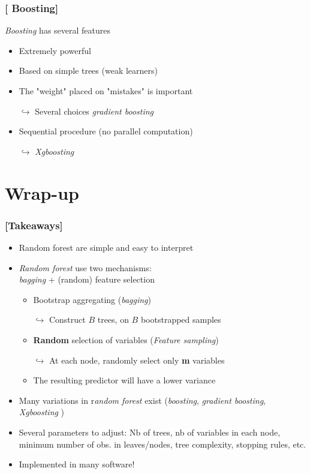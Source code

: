 \documentclass[xcolor=x11names,compress]{beamer}
\renewcommand{\(}{\begin{columns}}
\renewcommand{\)}{\end{columns}}
\newcommand{\<}[1]{\begin{column}{#1}}
\renewcommand{\>}{\end{column}}
\begin{document}
\begin{frame}
\frametitle{\textcolor{brique}{[ Boosting]}}
\textit{Boosting} has several features
\pause
 \begin{itemize}[<+->]
    \item  Extremely powerful
    \item  Based on simple trees (weak learners)
     \item The "weight" placed on "mistakes" is important
    \item[$\hookrightarrow$] Several choices \textit{gradient boosting}
    \item Sequential procedure (no parallel computation)
    \item[$\hookrightarrow$] \textit{Xgboosting}
 \end{itemize}
\end{frame}
%


\section{Wrap-up}

\begin{frame} %
\frametitle{\textcolor{brique}{[Takeaways]}}
\begin{itemize}[<+->]
\item Random forest are simple and easy to interpret
\item\textit{Random forest} use two mechanisms: \\
 \textit{bagging} + (random) feature selection
\begin{itemize}[<+->]
    \item Bootstrap aggregating (\textit{bagging})
    \item[$\hookrightarrow$] Construct $B$ trees, on $B$ bootstrapped samples
    \item \textbf{Random} selection of variables (\textit{Feature sampling})
    \item[$\hookrightarrow$] At each node, randomly select only \textbf{m} variables
    \item The resulting predictor will have a lower variance
    \end{itemize}
\item Many variations in r\emph{andom forest} exist (\textit{boosting}, \textit{gradient boosting}, \textit{Xgboosting} )
\item Several parameters to adjust: Nb of trees,  nb of variables in each node, minimum number of obs. in leaves/nodes,  tree complexity, stopping rules, etc.
\item  Implemented in many software!
\end{itemize}
\end{frame}
\end{document}
